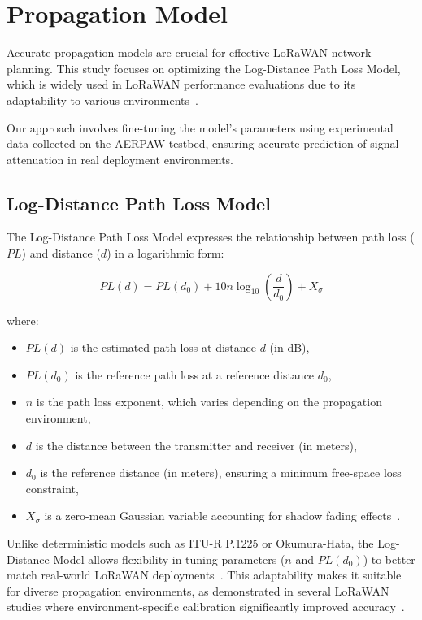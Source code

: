 \documentclass[journal]{IEEEtran}
\begin{document}
\section{Propagation Model}\label{sec:propagation_model}

Accurate propagation models are crucial for effective LoRaWAN network planning. This study focuses on optimizing the Log-Distance Path Loss Model, which is widely used in LoRaWAN performance evaluations due to its adaptability to various environments~\cite{Dieng2020ComparingNetworks}.

Our approach involves fine-tuning the model’s parameters using experimental data collected on the AERPAW testbed, ensuring accurate prediction of signal attenuation in real deployment environments.


\subsection{Log-Distance Path Loss Model}

The Log-Distance Path Loss Model expresses the relationship between path loss ($PL$) and distance ($d$) in a logarithmic form:

\begin{equation}
PL(d) = PL(d_0) + 10 n \log_{10} \left(\frac{d}{d_0} \right) + X_\sigma
\label{eq:logdistance}
\end{equation}

where:
\begin{itemize}
    \item $PL(d)$ is the estimated path loss at distance $d$ (in dB),
    \item $PL(d_0)$ is the reference path loss at a reference distance $d_0$,
    \item $n$ is the path loss exponent, which varies depending on the propagation environment,
    \item $d$ is the distance between the transmitter and receiver (in meters),
    \item $d_0$ is the reference distance (in meters), ensuring a minimum free-space loss constraint,
    \item $X_\sigma$ is a zero-mean Gaussian variable accounting for shadow fading effects~\cite{Dieng2020ComparingNetworks}.
\end{itemize}

Unlike deterministic models such as ITU-R P.1225 or Okumura-Hata, the Log-Distance Model allows flexibility in tuning parameters ($n$ and $PL(d_0)$) to better match real-world LoRaWAN deployments~\cite{Dieng2020ComparingNetworks}. This adaptability makes it suitable for diverse propagation environments, as demonstrated in several LoRaWAN studies where environment-specific calibration significantly improved accuracy~\cite{Ingabire2020PerformanceEnvironment}.
\end{document}
